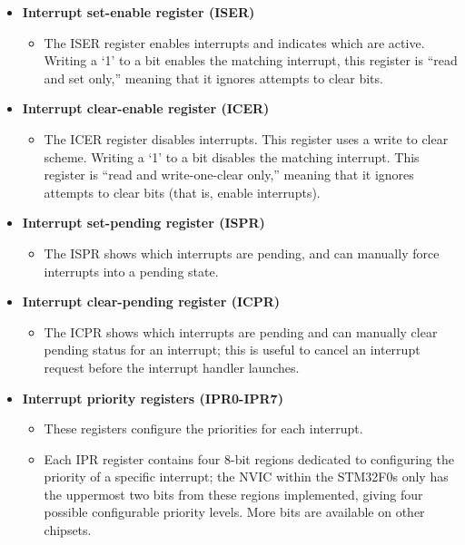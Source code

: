 \documentclass[11pt,fleqn]{book} %
\begin{document}
\begin{itemize}
    \item \textbf{Interrupt set-enable register (ISER)}
        \begin{itemize}
            \item The ISER register enables interrupts and indicates which are active.
            Writing a `1' to a bit enables the matching interrupt, this register is ``read and set only,'' meaning that it ignores attempts to clear bits. 
        \end{itemize}
    \item \textbf{Interrupt clear-enable register (ICER)}
        \begin{itemize}
            \item The ICER register disables interrupts.
            This register uses a write to clear scheme. Writing a `1' to a bit disables the matching interrupt. This register is ``read and write-one-clear only,'' meaning that it ignores attempts to clear bits (that is, enable interrupts). 
        \end{itemize}
    \item \textbf{Interrupt set-pending register (ISPR)}
        \begin{itemize}
            \item The ISPR shows which interrupts are pending, and can manually force interrupts into a pending state. 
        \end{itemize}
    \item \textbf{Interrupt clear-pending register (ICPR)}
        \begin{itemize}
            \item The ICPR shows which interrupts are pending and can manually clear pending status for an interrupt; this is useful to cancel an interrupt request before the interrupt handler launches.
        \end{itemize}
    \item \textbf{Interrupt priority registers (IPR0-IPR7)}
        \begin{itemize}
            \item These registers configure the priorities for each interrupt. 
            \item Each IPR register contains four 8-bit regions dedicated to configuring the priority of a specific interrupt; the NVIC within the STM32F0s only has the uppermost two bits from these regions implemented, giving four possible configurable priority levels. More bits are available on other chipsets.           
        \end{itemize}
\end{itemize}
\end{document}
